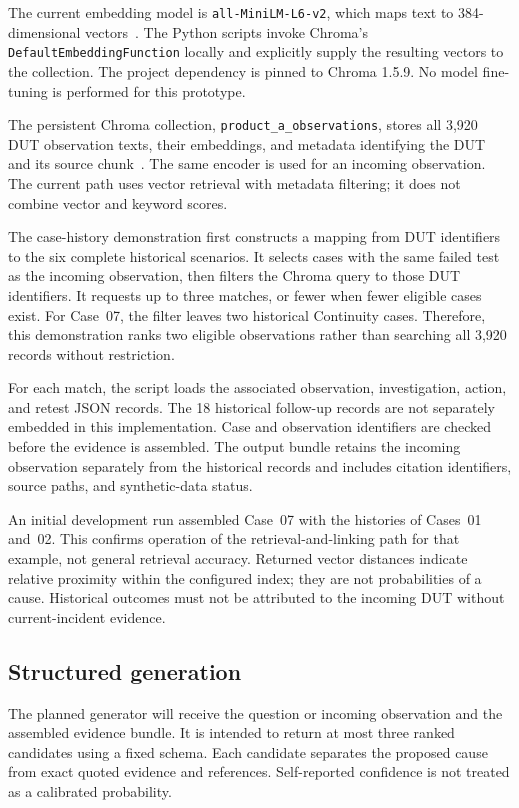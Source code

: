 \documentclass[conference]{IEEEtran}
\begin{document}
The current embedding model is \texttt{all-MiniLM-L6-v2},
which maps text to 384-dimensional vectors~\cite{minilmcard}.
The Python scripts invoke Chroma's
\texttt{DefaultEmbeddingFunction} locally and explicitly supply
the resulting vectors to the collection. The project dependency
is pinned to Chroma 1.5.9. No model fine-tuning is performed
for this prototype.

The persistent Chroma collection,
\texttt{product\_a\_observations}, stores all 3,920 DUT observation
texts, their embeddings, and metadata identifying the DUT and
its source chunk~\cite{chroma}. The same encoder is used for
an incoming observation. The current path uses vector retrieval
with metadata filtering; it does not combine vector and
keyword scores.

The case-history demonstration first constructs a mapping from
DUT identifiers to the six complete historical scenarios.
It selects cases with the same failed test as the incoming
observation, then filters the Chroma query to those DUT identifiers.
It requests up to three matches, or fewer when fewer eligible
cases exist. For Case~07, the filter leaves two historical
Continuity cases. Therefore, this demonstration ranks two eligible
observations rather than searching all 3,920 records
without restriction.

For each match, the script loads the associated observation,
investigation, action, and retest JSON records. The 18 historical
follow-up records are not separately embedded in this
implementation. Case and observation identifiers are checked
before the evidence is assembled. The output bundle retains
the incoming observation separately from the historical records
and includes citation identifiers, source paths, and
synthetic-data status.

An initial development run assembled Case~07 with the histories
of Cases~01 and~02. This confirms operation of the
retrieval-and-linking path for that example, not general retrieval
accuracy. Returned vector distances indicate relative proximity
within the configured index; they are not probabilities of a cause.
Historical outcomes must not be attributed to the incoming DUT
without current-incident evidence.

\subsection{Structured generation}

The planned generator will receive the question or incoming
observation and the assembled evidence bundle. It is intended
to return at most three ranked candidates using a fixed schema.
Each candidate separates the proposed cause from exact quoted
evidence and references. Self-reported confidence is not treated
as a calibrated probability.
\end{document}
